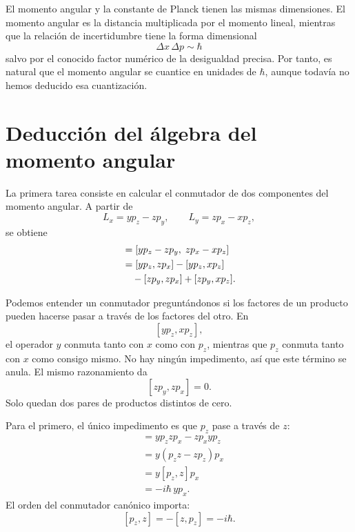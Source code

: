 El momento angular y la constante de Planck tienen las mismas dimensiones. El momento angular es la distancia multiplicada por el momento lineal, mientras que la relación de incertidumbre tiene la forma dimensional
\begin{equation}
\Delta x\,\Delta p\sim\hbar
\end{equation}
salvo por el conocido factor numérico de la desigualdad precisa. Por tanto, es natural que el momento angular se cuantice en unidades de \(\hbar\), aunque todavía no hemos deducido esa cuantización.

\section{Deducción del álgebra del momento angular}

La primera tarea consiste en calcular el conmutador de dos componentes del momento angular. A partir de
\[
L_x=yp_z-zp_y,\qquad
L_y=zp_x-xp_z,
\]
se obtiene
\begin{align}
[L_x,L_y]
&=[yp_z-zp_y,\;zp_x-xp_z] \\
&=[yp_z,zp_x]-[yp_z,xp_z] \notag\\
&\quad{}-[zp_y,zp_x]+[zp_y,xp_z].
\end{align}

\begin{classroomqa}
\end{classroomqa}

Podemos entender un conmutador preguntándonos si los factores de un producto pueden hacerse pasar a través de los factores del otro. En
\[
[yp_z,xp_z],
\]
el operador \(y\) conmuta tanto con \(x\) como con \(p_z\), mientras que \(p_z\) conmuta tanto con \(x\) como consigo mismo. No hay ningún impedimento, así que este término se anula. El mismo razonamiento da
\[
[zp_y,zp_x]=0.
\]
Solo quedan dos pares de productos distintos de cero.

Para el primero, el único impedimento es que \(p_z\) pase a través de \(z\):
\begin{align}
[yp_z,zp_x]
&=yp_zzp_x-zp_xyp_z \\
&=y(p_zz-zp_z)p_x \\
&=y[p_z,z]p_x \\
&=-i\hbar\,yp_x.
\end{align}
El orden del conmutador canónico importa:
\[
[p_z,z]=-[z,p_z]=-i\hbar.
\]

